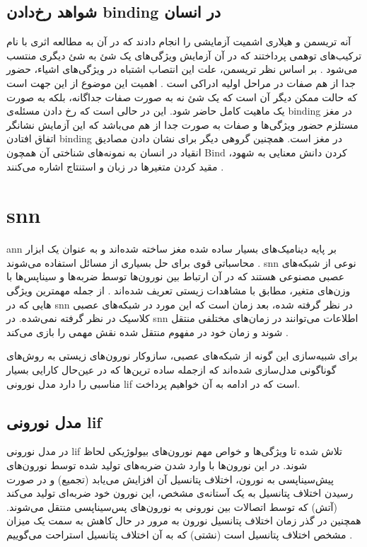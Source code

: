 \documentclass[12pt]{report}
\begin{document}
	
	\subsection{شواهد رخ‌دادن \gls{binding} در انسان}
	\label{subsection:binding-in-human}
	
	
	آنه تریسمن
	و هیلاری اشمیت
	آزمایشی را انجام دادند که در آن به مطالعه اثری با نام ترکیب‌های توهمی
	پرداختند که در آن آزمایش ویژگی‌های یک شئ به شئ دیگری منتسب می‌شود
	\cite{TREISMAN1982107}.
	بر اساس نظر تریسمن، علت این انتصاب اشتباه در ویژگی‌های اشیاء، حضور جدا از هم صفات در مراحل اولیه ادراکی است
	\cite{goldstein_2019}.
	اهمیت این موضوع از این جهت است که حالت ممکن دیگر آن است که یک شئ نه به صورت صفات جداگانه، بلکه به صورت یک ماهیت کامل حاضر شود. این در حالی است که رخ دادن مسئله‌ی \gls{binding} در مغز مستلزم حضور ویژگی‌ها و صفات به صورت جدا از هم می‌باشد که این آزمایش نشانگر اتفاق افتادن \gls{binding} در مغز است. همچنین گروهی دیگر برای نشان دادن مصادیق انقیاد در انسان به نمونه‌های شناختی آن همچون \gls{Bind} کردن دانش معنایی به شهود، مقید کردن متغیر‌ها در زبان و استنتاج اشاره می‌کنند \cite{greff2020binding}.
	
	
	\section{\gls{snn}}
	\gls{ann} بر پایه دینامیک‌های بسیار ساده شده مغز ساخته شده‌اند و به عنوان یک ابزار محاسباتی قوی برای حل بسیاری از مسائل استفاده می‌شوند
	\cite{TGNN}. 
	\gls{snn} نوعی از شبکه‌های عصبی مصنوعی هستند که در آن ارتباط بین نورون‌ها توسط ضربه‌ها و سیناپس‌ها  با وزن‌های متغیر، مطابق با مشاهدات زیستی تعریف شده‌اند
	\cite{ghosh2009spiking}. 
	از جمله مهمترین ویژگی هایی که در \gls{snn} در نظر گرفته شده، بعد زمان است
	\cite{Mozafari2019}
	که این مورد در شبکه‌های عصبی کلاسیک در نظر گرفته نمی‌شده. در \gls{snn} اطلاعات می‌توانند در زمان‌های مختلفی منتقل شوند و زمان خود در مفهوم منتقل شده نقش مهمی را بازی می‌کند
	\cite{SNN1997}.
	
	برای شبیه‌سازی این گونه از شبکه‌های عصبی، سازوکار نورون‌های زیستی به روش‌‌های گوناگونی مدل‌سازی شده‌اند که ازجمله ساده ترین‌ها که در عین‌حال کارایی بسیار مناسبی را دارد مدل نورونی \gls{lif} است که در ادامه به آن خواهیم پرداخت.
	
	
	\subsection{مدل نورونی \gls{lif}}
	در مدل نورونی \gls{lif} تلاش شده تا ویژگی‌ها و خواص مهم نورون‌های بیولوژیکی لحاظ شوند. در این نورون‌ها با وارد شدن ضربه‌های تولید شده توسط نورون‌های پیش‌سیناپسی به نورون، اختلاف پتانسیل آن افزایش می‌یابد (تجمیع) و در صورت رسیدن اختلاف پتانسیل به یک آستانه‌ی مشخص، این نورون خود ضربه‌ای تولید می‌کند (آتش) که توسط اتصالات بین نورونی به نورون‌های پس‌سیناپسی منتقل می‌شوند. همچنین در گذر زمان اختلاف پتانسیل نورون به مرور در حال کاهش به سمت یک میزان مشخص اختلاف پتانسیل است (نشتی) که به آن اختلاف پتانسیل استراحت می‌گوییم
	\cite{gerstner2014neuronal}.
	
\end{document}
